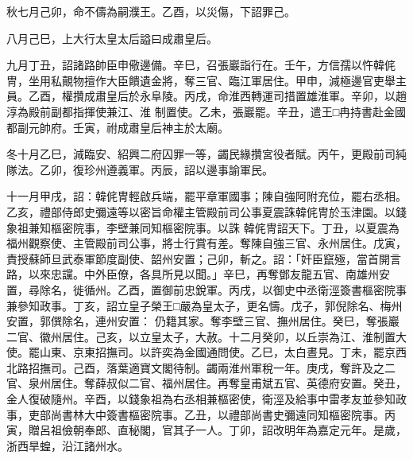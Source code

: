 \begin{pinyinscope}
 秋七月己卯，命不儔為嗣濮王。乙酉，以災傷，下詔罪己。



 八月己巳，上大行太皇太后謚曰成肅皇后。



 九月丁丑，詔諸路帥臣申儆邊備。辛巳，召張巖詣行在。壬午，方信孺以忤韓侂冑，坐用私覿物擅作大臣饋遺金將，奪三官、臨江軍居住。甲申，減極邊官吏舉主員。乙酉，權攢成肅皇后於永阜陵。丙戌，命淮西轉運司措置雄淮軍。辛卯，以趙淳為殿前副都指揮使兼江、淮
 制置使。乙未，張巖罷。辛丑，遣王□冉持書赴金國都副元帥府。壬寅，祔成肅皇后神主於太廟。



 冬十月乙巳，減臨安、紹興二府囚罪一等，蠲民緣攢宮役者賦。丙午，更殿前司純隊法。乙卯，復珍州遵義軍。丙辰，詔以邊事諭軍民。



 十一月甲戌，詔：韓侂冑輕啟兵端，罷平章軍國事；陳自強阿附充位，罷右丞相。乙亥，禮部侍郎史彌遠等以密旨命權主管殿前司公事夏震誅韓侂冑於玉津園。以錢象祖兼知樞密院事，李壁兼同知樞密院事。以誅
 韓侂冑詔天下。丁丑，以夏震為福州觀察使、主管殿前司公事，將士行賞有差。奪陳自強三官、永州居住。戊寅，責授蘇師旦武泰軍節度副使、韶州安置；己卯，斬之。詔：「奸臣竄殛，當首開言路，以來忠讜。中外臣僚，各具所見以聞。」辛巳，再奪鄧友龍五官、南雄州安置，尋除名，徙循州。乙酉，置御前忠銳軍。丙戌，以御史中丞衛涇簽書樞密院事兼參知政事。丁亥，詔立皇子榮王□嚴為皇太子，更名懤。戊子，郭倪除名、梅州安置，郭僎除名，連州安置：
 仍籍其家。奪李壁三官、撫州居住。癸巳，奪張巖二官、徽州居住。己亥，以立皇太子，大赦。十二月癸卯，以丘崇為江、淮制置大使。罷山東、京東招撫司。以許奕為金國通問使。乙巳，太白晝見。丁未，罷京西北路招撫司。己酉，落葉適寶文閣待制。蠲兩淮州軍稅一年。庚戌，奪許及之二官、泉州居住。奪薛叔似二官、福州居住。再奪皇甫斌五官、英德府安置。癸丑，金人復破隨州。辛酉，以錢象祖為右丞相兼樞密使，衛涇及給事中雷孝友並參知政
 事，吏部尚書林大中簽書樞密院事。乙丑，以禮部尚書史彌遠同知樞密院事。丙寅，贈呂祖儉朝奉郎、直秘閣，官其子一人。丁卯，詔改明年為嘉定元年。是歲，浙西旱蝗，沿江諸州水。



\end{pinyinscope}